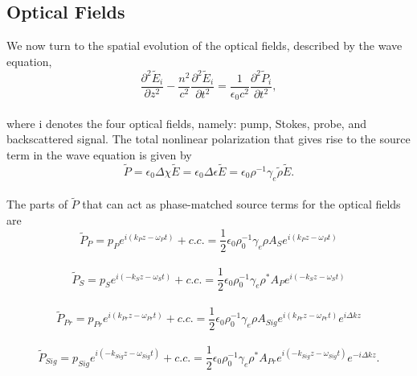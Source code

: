 \documentclass[%
  reprint,
  superscriptaddress,
  amsmath,amssymb,
  aps,
  prapplied,
]{revtex4-2}
\begin{document}
\subsection{Optical Fields}\label{Coupled-Wave Equations:Optical Fields}

We now turn to the spatial evolution of the optical fields, described by the wave equation,
\\
\begin{equation}
    \frac{\partial^{2}\tilde{E}_{i}}{\partial z^{2}} - \frac{n^{2}}{c^{2}}\frac{\partial^{2}\tilde{E}_{i}}{\partial t^{2}} = \frac{1}{\epsilon_{0}c^{2}}\frac{\partial^{2}\tilde{P}_{i}}{\partial t^{2}},
    \label{eq:Wave equation}
\end{equation}
\\
where i denotes the four optical fields, namely: pump, Stokes, probe, and backscattered signal. The total nonlinear polarization that gives rise to the source term in the wave equation is given by
\\
\begin{equation}
    \tilde{P} = \epsilon_{0}\Delta\chi\tilde{E} = \epsilon_{0}\Delta\epsilon\tilde{E} = \epsilon_{0}\rho^{-1}\gamma_{e}\tilde{\rho}\tilde{E}.
\end{equation}
\\
The parts of $\tilde{P}$ that can act as phase-matched source terms for the optical fields are
\\
\begin{equation}
    \tilde{P}_{P} = p_{P}e^{i(k_{P}z - \omega_{P} t)} + c.c. = \frac{1}{2}\epsilon_{0}\rho_{0}^{-1}\gamma_{e}\rho A_{S}e^{i(k_{P}z - \omega_{P} t)}
    \label{eq:Pump phase-matched source term}
\end{equation}
\\
\begin{equation}
    \tilde{P}_{S} = p_{S}e^{i(-k_{S}z - \omega_{S} t)} + c.c. = \frac{1}{2}\epsilon_{0}\rho_{0}^{-1}\gamma_{e}\rho^{*} A_{P}e^{i(-k_{S}z - \omega_{S} t)}
    \label{eq:Stokes phase-matched source term}
\end{equation}
\\
\begin{equation}
    \tilde{P}_{Pr} = p_{Pr}e^{i(k_{Pr}z - \omega_{Pr} t)} + c.c. = \frac{1}{2}\epsilon_{0}\rho_{0}^{-1}\gamma_{e}\rho A_{Sig}e^{i(k_{Pr}z - \omega_{Pr} t)}e^{i\Delta kz}
    \label{eq:Probe phase-matched source term}
\end{equation}
\\
\begin{equation}
    \tilde{P}_{Sig} = p_{Sig}e^{i(-k_{Sig}z - \omega_{Sig} t)} + c.c. = \frac{1}{2}\epsilon_{0}\rho_{0}^{-1}\gamma_{e}\rho^{*} A_{Pr}e^{i(-k_{Sig}z - \omega_{Sig} t)}e^{-i\Delta kz}.
    \label{eq:Signal phase-matched source term}
\end{equation}
\end{document}

